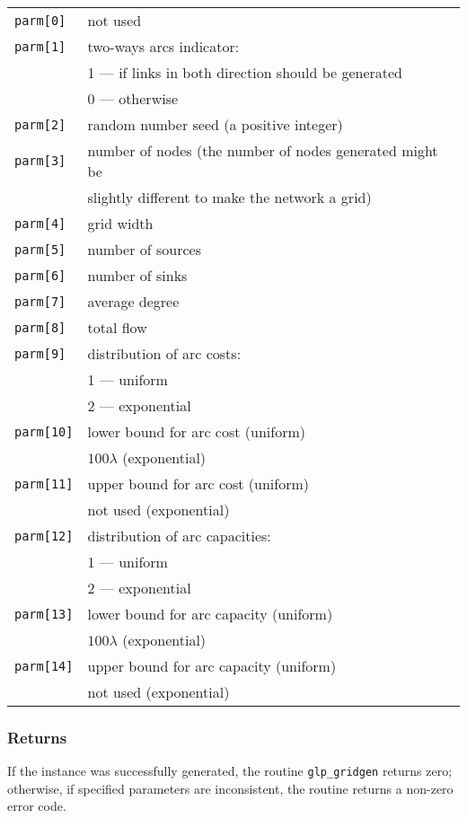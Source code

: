 \documentclass[dvipdfm,11pt]{report}
\begin{document}
\begin{tabular}{@{}ll@{}}
\verb|parm[0] |&not used\\
\verb|parm[1] |&two-ways arcs indicator:\\
               &1 --- if links in both direction should be generated\\
               &0 --- otherwise\\
\verb|parm[2] |&random number seed (a positive integer)\\
\verb|parm[3] |&number of nodes (the number of nodes generated might
be\\&slightly different to make the network a grid)\\
\verb|parm[4] |&grid width\\
\verb|parm[5] |&number of sources\\
\verb|parm[6] |&number of sinks\\
\verb|parm[7] |&average degree\\
\verb|parm[8] |&total flow\\
\verb|parm[9] |&distribution of arc costs:\\
               &1 --- uniform\\
               &2 --- exponential\\
\verb|parm[10]|&lower bound for arc cost (uniform)\\
               &$100\lambda$ (exponential)\\
\verb|parm[11]|&upper bound for arc cost (uniform)\\
               &not used (exponential)\\
\verb|parm[12]|&distribution of arc capacities:\\
               &1 --- uniform\\
               &2 --- exponential\\
\verb|parm[13]|&lower bound for arc capacity (uniform)\\
               &$100\lambda$ (exponential)\\
\verb|parm[14]|&upper bound for arc capacity (uniform)\\
               &not used (exponential)\\
\end{tabular}

\subsubsection*{Returns}

If the instance was successfully generated, the routine
\verb|glp_gridgen| returns zero; otherwise, if specified parameters are
inconsistent, the routine returns a non-zero error code.
\end{document}

